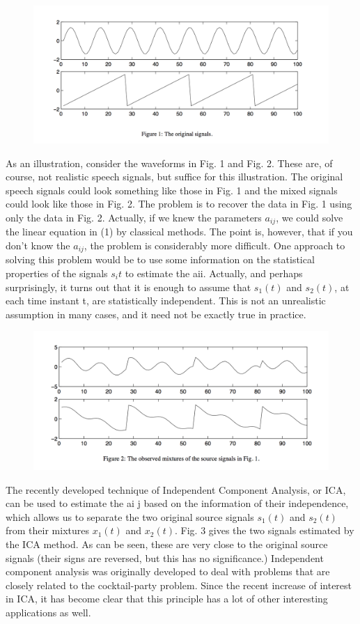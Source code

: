 \documentclass[12pt, a4paper, onecolumn]{IEEEtran}
\begin{document}
\begin{figure}[h]
    \centering
    \includegraphics[width=1\textwidth]{1}
\end{figure}
As an illustration, consider the waveforms in Fig. 1 and Fig. 2. These are, of course, not realistic speech signals, but suffice for this illustration. The original speech signals could look something like those in Fig. 1 and the mixed signals could look like those in Fig. 2. The problem is to recover the data in Fig. 1 using only the data in Fig. 2.
Actually, if we knew the parameters $a_{ij}$, we could solve the linear equation in (1) by classical methods. The point is, however, that if you don’t know the $a_{ij}$, the problem is considerably more difficult.
One approach to solving this problem would be to use some information on the statistical properties of the signals $s_i{t}$ to estimate the aii. Actually, and perhaps surprisingly, it turns out that it is enough to assume that $s_1(t)$ and $s_2(t)$, at each time instant t, are statistically independent. This is not an unrealistic assumption in many cases, and it need not be exactly true in practice.
\begin{figure}[h]
    \centering
    \includegraphics[width=1\textwidth]{2}
\end{figure}
The recently developed technique of Independent Component Analysis, or ICA, can be used to estimate the ai j based on the information of their independence, which allows us to separate the two original source signals $s_1(t)$ and $s_2(t)$ from their mixtures $x_1(t)$ and $x_2(t)$. Fig. 3 gives the two signals estimated by the ICA method. As can be seen, these are very close to the original source signals (their signs are reversed, but this has no significance.)
Independent component analysis was originally developed to deal with problems that are closely related to the cocktail-party problem. Since the recent increase of interest in ICA, it has become clear that this principle has a lot of other interesting applications as well.
\end{document}

